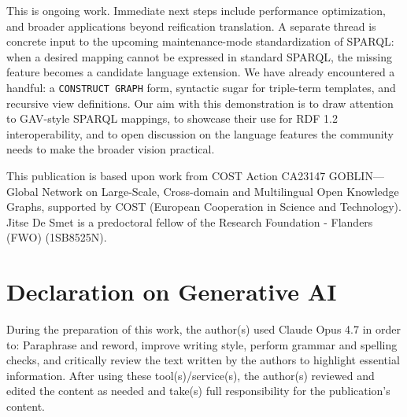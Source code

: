 \documentclass[
]{ceurart}
\begin{document}
This is ongoing work. Immediate next steps include performance
optimization, and broader applications beyond reification translation.
A separate thread is concrete input to the upcoming maintenance-mode
standardization of SPARQL: when a desired mapping cannot be expressed
in standard SPARQL, the missing feature becomes a candidate language
extension. We have already encountered a handful: a \texttt{CONSTRUCT
  GRAPH} form, syntactic sugar for triple-term templates, and
recursive view definitions. Our aim with this demonstration is to draw
attention to GAV-style SPARQL mappings, to showcase their use for RDF
1.2 interoperability, and to open discussion on the language features
the community needs to make the broader vision practical.

\begin{acknowledgments}
  This publication is based upon work from COST Action CA23147
  GOBLIN---Global Network on Large-Scale, Cross-domain and
  Multilingual Open Knowledge Graphs, supported by COST (European
  Cooperation in Science and Technology). Jitse De Smet is a
  predoctoral fellow of the Research Foundation - Flanders (FWO)
  (1SB8525N).
\end{acknowledgments}

\section*{Declaration on Generative AI}

During the preparation of this work, the author(s) used Claude Opus
4.7 in order to: Paraphrase and reword, improve writing style,
perform
grammar and spelling checks, and critically review the text written by
the authors to highlight essential information. After using these
tool(s)/service(s), the author(s) reviewed and edited the content as
needed and take(s) full responsibility for the publication's content.


\end{document}

